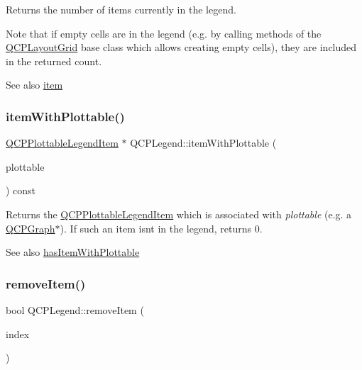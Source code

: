 Returns the number of items currently in the legend.

Note that if empty cells are in the legend (e.\+g. by calling methods of the \hyperlink{class_q_c_p_layout_grid}{Q\+C\+P\+Layout\+Grid} base class which allows creating empty cells), they are included in the returned count.

\begin{DoxySeeAlso}{See also}
\hyperlink{class_q_c_p_legend_acfe9694c45104a3359d3806ed366fcf7}{item} 
\end{DoxySeeAlso}
\mbox{\label{class_q_c_p_legend_a91e790002d8bf15a20628a8e8841e397}} 
\subsubsection{\texorpdfstring{item\+With\+Plottable()}{itemWithPlottable()}}
{\footnotesize\ttfamily \hyperlink{class_q_c_p_plottable_legend_item}{Q\+C\+P\+Plottable\+Legend\+Item} $\ast$ Q\+C\+P\+Legend\+::item\+With\+Plottable (\begin{DoxyParamCaption}\item[{const \hyperlink{class_q_c_p_abstract_plottable}{Q\+C\+P\+Abstract\+Plottable} $\ast$}]{plottable }\end{DoxyParamCaption}) const}

Returns the \hyperlink{class_q_c_p_plottable_legend_item}{Q\+C\+P\+Plottable\+Legend\+Item} which is associated with {\itshape plottable} (e.\+g. a \hyperlink{class_q_c_p_graph}{Q\+C\+P\+Graph}$\ast$). If such an item isn\textquotesingle{}t in the legend, returns 0.

\begin{DoxySeeAlso}{See also}
\hyperlink{class_q_c_p_legend_a4b90a442af871582df85c2bc13f91e88}{has\+Item\+With\+Plottable} 
\end{DoxySeeAlso}
\mbox{\label{class_q_c_p_legend_ac91595c3eaa746fe6321d2eb952c63bb}} 
\subsubsection{\texorpdfstring{remove\+Item()}{removeItem()}\hspace{0.1cm}{\footnotesize\ttfamily [1/2]}}
{\footnotesize\ttfamily bool Q\+C\+P\+Legend\+::remove\+Item (\begin{DoxyParamCaption}\item[{int}]{index }\end{DoxyParamCaption})}

